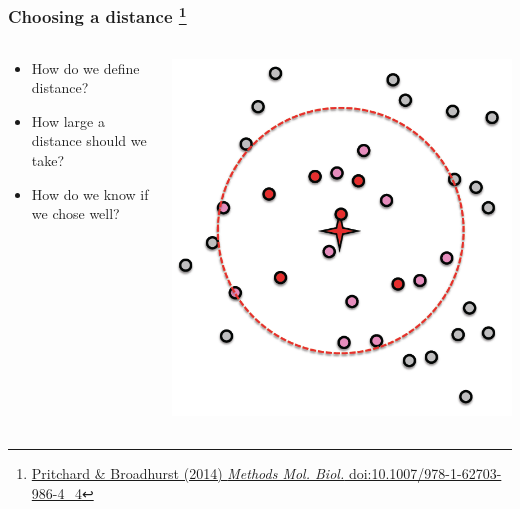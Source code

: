 \begin{frame}
  \frametitle{Choosing a distance
  \footnote{\tiny{\href{http://dx.doi.org/10.1007/978-1-62703-986-4_4}{Pritchard \& Broadhurst (2014) \textit{Methods Mol. Biol.} doi:10.1007/978-1-62703-986-4\_4}}}
}
  \begin{columns}[T]
    \begin{column}{5cm}  
      \begin{itemize}  
        \item \textcolor{hutton_green}{How do we define distance?}
        \item \textcolor{hutton_blue}{How large a distance should we take?}
        \item \textcolor{hutton_purple}{How do we know if we chose well?}
        \end{itemize}  
      \end{column}
    \begin{column}{5cm}  
      \includegraphics[width=1\textwidth,valign=b]{images/finding_effectors4}    
    \end{column}
  \end{columns}  
\end{frame}

